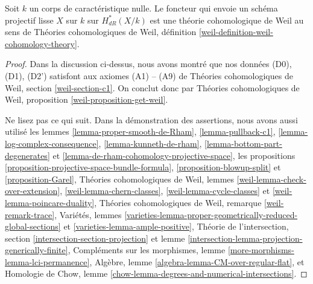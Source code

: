 \begin{proposition}
\label{proposition-de-rham-is-weil}
Soit $k$ un corps de caractéristique nulle. Le foncteur qui
envoie un schéma projectif lisse $X$ sur $k$ sur $H_{dR}^*(X/k)$
est une théorie cohomologique de Weil au sens de
Théories cohomologiques de Weil, définition
\ref{weil-definition-weil-cohomology-theory}.
\end{proposition}

\begin{proof}
Dans la discussion ci-dessus, nous avons montré que nos données (D0), (D1), (D2')
satisfont aux axiomes (A1) -- (A9) de Théories cohomologiques de Weil, section
\ref{weil-section-c1}. On conclut donc par
Théories cohomologiques de Weil, proposition \ref{weil-proposition-get-weil}.

\medskip\noindent
Ne lisez pas ce qui suit. Dans la démonstration des assertions, nous avons aussi utilisé les
lemmes \ref{lemma-proper-smooth-de-Rham},
\ref{lemma-pullback-c1},
\ref{lemma-log-complex-consequence},
\ref{lemma-kunneth-de-rham},
\ref{lemma-bottom-part-degenerates} et
\ref{lemma-de-rham-cohomology-projective-space},
les propositions
\ref{proposition-projective-space-bundle-formula},
\ref{proposition-blowup-split} et
\ref{proposition-Garel},
Théories cohomologiques de Weil, lemmes
\ref{weil-lemma-check-over-extension},
\ref{weil-lemma-chern-classes},
\ref{weil-lemma-cycle-classes} et
\ref{weil-lemma-poincare-duality},
Théories cohomologiques de Weil, remarque \ref{weil-remark-trace},
Variétés, lemmes
\ref{varieties-lemma-proper-geometrically-reduced-global-sections} et
\ref{varieties-lemma-ample-positive},
Théorie de l'intersection, section \ref{intersection-section-projection} et
lemme \ref{intersection-lemma-projection-generically-finite},
Compléments sur les morphismes, lemme \ref{more-morphisms-lemma-lci-permanence},
Algèbre, lemme \ref{algebra-lemma-CM-over-regular-flat}, et
Homologie de Chow, lemme
\ref{chow-lemma-degrees-and-numerical-intersections}.
\end{proof}

